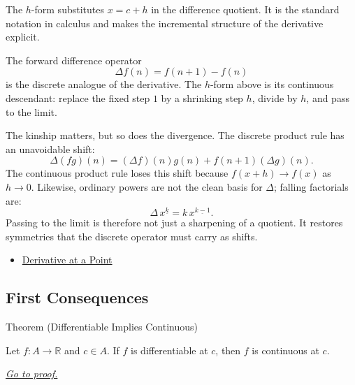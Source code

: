 \begin{remark*}[Interpretation]
The $h$-form substitutes $x = c + h$ in the difference quotient. It is the standard notation in calculus and makes the incremental structure of the derivative explicit.


The forward difference operator
\[
  \Delta f(n)=f(n+1)-f(n)
\]
is the discrete analogue of the derivative. The \(h\)-form above is its
continuous descendant: replace the fixed step \(1\) by a shrinking step
\(h\), divide by \(h\), and pass to the limit.

The kinship matters, but so does the divergence. The discrete product rule
has an unavoidable shift:
\[
  \Delta(fg)(n)
  =
  (\Delta f)(n)g(n)+f(n+1)(\Delta g)(n).
\]
The continuous product rule loses this shift because \(f(x+h)\to f(x)\) as
\(h\to0\). Likewise, ordinary powers are not the clean basis for \(\Delta\);
falling factorials are:
\[
  \Delta\,x^{\underline{k}}=k\,x^{\underline{k-1}}.
\]
Passing to the limit is therefore not just a sharpening of a quotient. It
restores symmetries that the discrete operator must carry as shifts.
\end{remark*}

\begin{dependencies}
\begin{itemize}
  \item \hyperref[def:derivative-at-a-point]{Derivative at a Point}
\end{itemize}
\end{dependencies}


\subsection{First Consequences}

\begin{theorembox}{Theorem (Differentiable Implies Continuous)}
\begin{theorem}
\label{thm:differentiable-implies-continuous}
Let $f : A \to \mathbb{R}$ and $c \in A$. If $f$ is differentiable at $c$, then $f$ is continuous at $c$.

\smallskip\noindent
\hyperref[prf:differentiable-implies-continuous]{\textit{Go to proof.}}
\end{theorem}
\end{theorembox}

